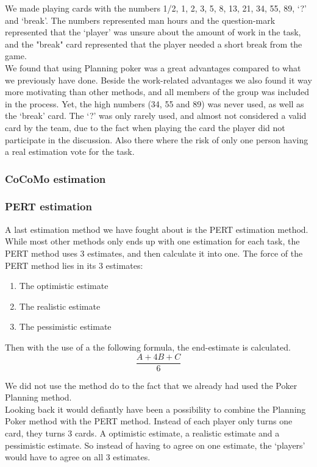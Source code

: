 We made playing cards with the numbers 1/2, 1, 2, 3, 5, 8, 13, 21, 34, 55, 89, `?' and `break'. The numbers represented man hours and the question-mark represented that the `player' was unsure about the amount of work in the task, and the "break" card represented that the player needed a short break from the game.\\
We found that using Planning poker was a great advantages compared to what we previously have done. Beside the work-related advantages we also found it way more motivating than other methods, and all members of the group was included in the process. Yet, the high numbers (34, 55 and 89) was never used, as well as the `break' card. The `?' was only rarely used, and almost not considered a valid card by the team, due to the fact when playing the card the player did not participate in the discussion. Also there where the risk of only one person having a real estimation vote for the task.

\subsubsection{CoCoMo estimation}
\subsubsection{PERT estimation}
A last estimation method we have fought about is the PERT estimation method. While most other methods only ends up with one estimation for each task, the PERT method uses 3 estimates, and then calculate it into one. The force of the PERT method lies in its 3 estimates:
\begin{enumerate}[label=\Alph{*}\hspace{0.8em}]
	\item The optimistic estimate
	\item The realistic estimate
	\item The pessimistic estimate
\end{enumerate}
Then with the use of a the following formula, the end-estimate is calculated.
\begin{equation}
	\frac{A+4B+C}{6}
\end{equation}

We did not use the method do to the fact that we already had used the Poker Planning method.\\
Looking back it would defiantly have been a possibility to combine the Planning Poker method with the PERT method. Instead of each player only turns one card, they turns 3 cards. A optimistic estimate, a realistic estimate and a pessimistic estimate. So instead of having to agree on one estimate, the `players' would have to agree on all 3 estimates.